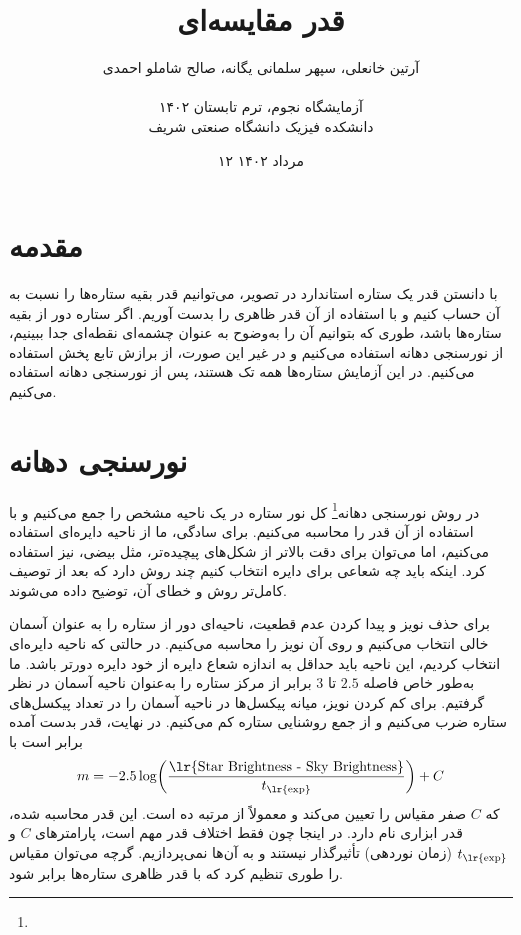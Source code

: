 \documentclass[12pt,a4paper]{article}
\title{قدر مقایسه‌ای}
\author{آرتین خانعلی، سپهر سلمانی یگانه، صالح شاملو احمدی\\\\
	آزمایشگاه نجوم، ترم تابستان ۱۴۰۲\\دانشکده فیزیک دانشگاه صنعتی شریف}
\date{۱۲ مرداد ۱۴۰۲}
\begin{document}
	\maketitle
	\section{مقدمه}
	با دانستن قدر یک ستاره استاندارد در تصویر، می‌توانیم قدر بقیه ستاره‌ها را نسبت به آن حساب کنیم و با استفاده از آن
	قدر ظاهری را بدست آوریم. اگر ستاره دور از بقیه ستاره‌ها باشد، طوری که بتوانیم آن را به‌وضوح به عنوان چشمه‌ای نقطه‌ای
	جدا ببینیم، از نورسنجی دهانه استفاده می‌کنیم و در غیر این صورت، از برازش تابع پخش استفاده می‌کنیم. در این آزمایش
	ستاره‌ها همه تک هستند، پس از نورسنجی دهانه استفاده می‌کنیم.
	\section{نورسنجی دهانه}
	در روش نورسنجی دهانه\footnote{} کل نور ستاره در یک ناحیه مشخص را جمع می‌کنیم و با استفاده
	از آن قدر را محاسبه می‌کنیم. برای سادگی، ما از ناحیه دایره‌ای استفاده می‌کنیم، اما می‌توان برای دقت بالاتر از شکل‌های
	پیچیده‌تر، مثل بیضی، نیز استفاده کرد. اینکه باید چه شعاعی برای دایره انتخاب کنیم چند روش دارد که بعد از توصیف
	کامل‌تر روش و خطای آن، توضیح داده می‌شوند.
	
	برای حذف نویز و پیدا کردن عدم قطعیت، ناحیه‌ای دور از ستاره را به عنوان آسمان خالی انتخاب می‌کنیم و روی آن نویز را
	محاسبه می‌کنیم. در حالتی که ناحیه دایره‌ای انتخاب کردیم، این ناحیه باید حداقل به اندازه شعاع دایره از خود دایره
	دورتر باشد. ما به‌طور خاص فاصله $2.5$ تا $3$ برابر از مرکز ستاره را به‌عنوان ناحیه آسمان در نظر گرفتیم. برای کم
	کردن نویز، میانه پیکسل‌ها در ناحیه آسمان را در تعداد پیکسل‌های ستاره ضرب می‌کنیم و از جمع روشنایی ستاره کم می‌کنیم.
	در نهایت، قدر بدست آمده برابر است با
	\begin{equation}
		m = -2.5\log(\frac{\text{\lr{Star Brightness - Sky Brightness}}}{t_{\text{\lr{exp}}}}) + C
	\end{equation}
	که $C$ صفر مقیاس را تعیین می‌کند و معمولاً از مرتبه ده است. این قدر محاسبه شده، قدر ابزاری نام دارد. در اینجا چون
	فقط اختلاف قدر مهم است، پارامترهای $C$ و $t_{\text{\lr{exp}}}$ (زمان نوردهی) تأثیرگذار نیستند و به آن‌ها نمی‌پردازیم.
	گرچه می‌توان مقیاس را طوری تنظیم کرد که با قدر ظاهری ستاره‌ها برابر شود.
	
\end{document}
